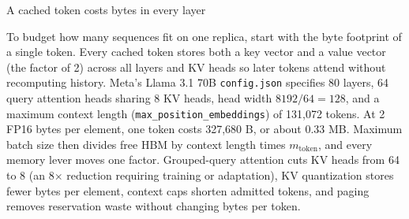 \documentclass[aspectratio=169, 12pt]{beamer}
\begin{document}
\begin{frame}{A cached token costs bytes in every layer}
{  To budget how many sequences fit on one replica, start with the byte footprint of a single token. Every cached token stores both a key vector and a value vector (the factor of 2) across all layers and KV heads so later tokens attend without recomputing history. Meta's Llama 3.1 70B \texttt{config.json} specifies 80 layers, 64 query attention heads sharing 8 KV heads, head width $8192/64 = 128$, and a maximum context length (\texttt{max\_position\_embeddings}) of 131,072 tokens. At 2 FP16 bytes per element, one token costs 327,680 B, or about 0.33 MB. Maximum batch size then divides free HBM by context length times $m_{\text{token}}$, and every memory lever moves one factor. Grouped-query attention cuts KV heads from 64 to 8 (an 8$\times$ reduction requiring training or adaptation), KV quantization stores fewer bytes per element, context caps shorten admitted tokens, and paging removes reservation waste without changing bytes per token.


}
\end{frame}
\end{document}
